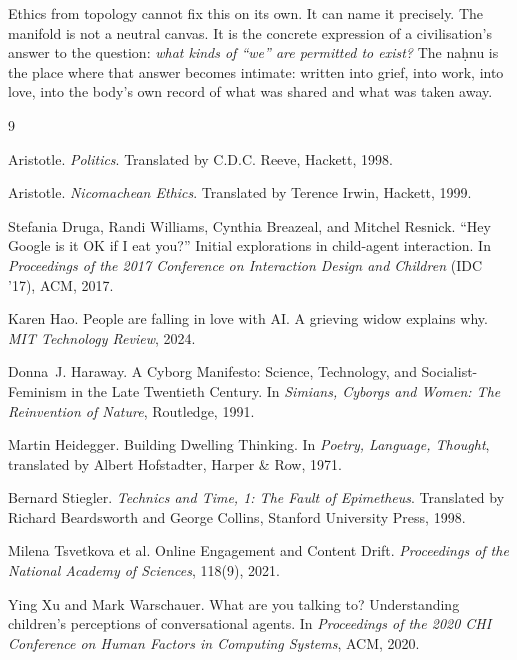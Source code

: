 \documentclass[12pt,a4paper]{article}
\begin{document}
Ethics from topology cannot fix this on its own. It can name it precisely. The manifold is not a neutral canvas. It is the concrete expression of a civilisation's answer to the question: \emph{what kinds of ``we'' are permitted to exist?} The na\d{h}nu is the place where that answer becomes intimate: written into grief, into work, into love, into the body's own record of what was shared and what was taken away.


\begin{thebibliography}{9}

Aristotle.
\newblock \emph{Politics}.
\newblock Translated by C.D.C. Reeve, Hackett, 1998.

Aristotle.
\newblock \emph{Nicomachean Ethics}.
\newblock Translated by Terence Irwin, Hackett, 1999.

Stefania Druga, Randi Williams, Cynthia Breazeal, and Mitchel Resnick.
\newblock ``Hey Google is it OK if I eat you?'' Initial explorations in child-agent interaction.
\newblock In \emph{Proceedings of the 2017 Conference on Interaction Design and Children} (IDC '17), ACM, 2017.

Karen Hao.
\newblock People are falling in love with AI\@. A grieving widow explains why.
\newblock \emph{MIT Technology Review}, 2024.

Donna~J. Haraway.
\newblock A Cyborg Manifesto: Science, Technology, and Socialist-Feminism in the Late Twentieth Century.
\newblock In \emph{Simians, Cyborgs and Women: The Reinvention of Nature}, Routledge, 1991.

Martin Heidegger.
\newblock Building Dwelling Thinking.
\newblock In \emph{Poetry, Language, Thought}, translated by Albert Hofstadter, Harper \& Row, 1971.

Bernard Stiegler.
\newblock \emph{Technics and Time, 1: The Fault of Epimetheus}.
\newblock Translated by Richard Beardsworth and George Collins, Stanford University Press, 1998.

Milena Tsvetkova et al.
\newblock Online Engagement and Content Drift.
\newblock \emph{Proceedings of the National Academy of Sciences}, 118(9), 2021.

Ying Xu and Mark Warschauer.
\newblock What are you talking to? Understanding children's perceptions of conversational agents.
\newblock In \emph{Proceedings of the 2020 CHI Conference on Human Factors in Computing Systems}, ACM, 2020.

\end{thebibliography}
\end{document}

